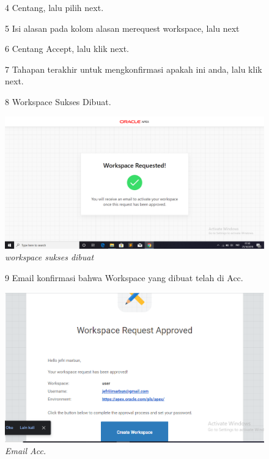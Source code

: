 \begin{enumerate}
\begin{figure}
        
\item[4]Centang, lalu pilih next.  

      
\item[5]Isi alasan pada kolom alasan merequest workspace, lalu next

 
\item[6] Centang Accept, lalu klik next.


\item[7] Tahapan terakhir untuk mengkonfirmasi apakah ini anda, lalu klik next.

   
\item[8] Workspace Sukses Dibuat.

    \begin{center}
\includegraphics[scale=0.2]{apex/apex3.png}
    \caption{\textit{workspace sukses dibuat}}
        \end{center}
\label{gambar}
\end{figure}

\begin{figure}
\item[9] Email konfirmasi bahwa Workspace yang dibuat telah di Acc.

    \begin{center}
\includegraphics[scale=0.4]{apex/apex4.png}
    \caption{\textit{Email Acc.}}
        \end{center}
\label{gambar}
\end{figure}


\end{enumerate}
